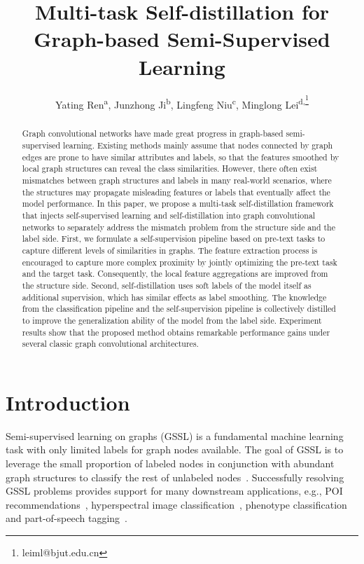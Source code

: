 \documentclass[letterpaper]{article} \usepackage{aaai22} \usepackage{times} \usepackage{helvet} \usepackage{courier} \usepackage[hyphens]{url} \usepackage{graphicx} \urlstyle{rm} \def\UrlFont{\rm} \usepackage{subfigure}
\title{Multi-task Self-distillation for Graph-based Semi-Supervised Learning}
\author {
Yating Ren\textsuperscript{\rm a}, Junzhong Ji\textsuperscript{\rm b}, Lingfeng Niu\textsuperscript{\rm c}, Minglong Lei\textsuperscript{\rm d,\thanks{leiml@bjut.edu.cn}} \\
}
\begin{document}
	
	\maketitle
	\thispagestyle{fancy}
	\fancyhead{}
	\lfoot{}
	\cfoot{}
	\rfoot{}
	
	\begin{abstract}
		Graph convolutional networks have made great progress in graph-based semi-supervised learning. Existing methods mainly assume that nodes connected by graph edges are prone to have similar attributes and labels, so that the features smoothed by local graph structures can reveal the class similarities. However, there often exist mismatches between graph structures and labels in many real-world scenarios, where the structures may propagate misleading features or labels that eventually affect the model performance. In this paper, we propose a multi-task self-distillation framework that injects self-supervised learning and self-distillation into graph convolutional networks to separately address the mismatch problem from the structure side and the label side. First, we formulate a self-supervision pipeline based on pre-text tasks to capture different levels of similarities in graphs. The feature extraction process is encouraged to capture more complex proximity by jointly optimizing the pre-text task and the target task. Consequently, the local feature aggregations are improved from the structure side. Second, self-distillation uses soft labels of the model itself as additional supervision, which has similar effects as label smoothing. The knowledge from the classification pipeline and the self-supervision pipeline is collectively distilled to improve the generalization ability of the model from the label side. Experiment results show that the proposed method obtains remarkable performance gains under several classic graph convolutional architectures.
	\end{abstract}
	
	\section{Introduction}
	Semi-supervised learning on graphs (GSSL) is a fundamental machine learning task with only limited labels for graph nodes available. The goal of GSSL is to leverage the small proportion of labeled nodes in conjunction with abundant graph structures to classify the rest of unlabeled nodes~\cite{zhu2005semiGraph}. Successfully resolving GSSL problems provides support for many downstream applications, e.g., POI recommendations~\cite{yang2017bridging}, hyperspectral image classification~\cite{shao2018spatial}, phenotype classification~\cite{doostparast2018graph} and part-of-speech tagging~\cite{subramanya2010efficient}.
	
\end{document}

